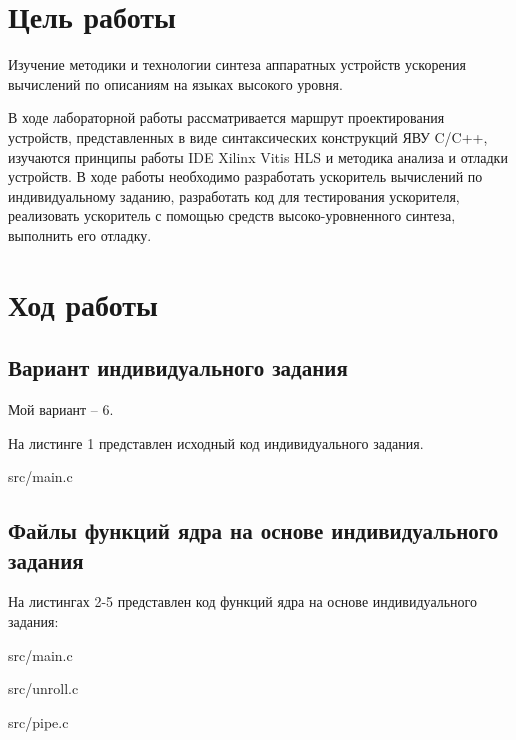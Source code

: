 \chapter*{Цель работы}
Изучение методики и технологии синтеза аппаратных устройств ускорения вычислений по описаниям на языках высокого уровня. 

В ходе лабораторной работы рассматривается маршрут проектирования устройств, представленных в виде синтаксических конструкций ЯВУ C/C++, изучаются принципы работы IDE Xilinx Vitis HLS и методика анализа и отладки устройств. В ходе работы необходимо разработать ускоритель вычислений по индивидуальному заданию, разработать код для тестирования ускорителя, реализовать ускоритель с помощью средств высоко-уровненного синтеза, выполнить его отладку.

\chapter*{Ход работы}

\section*{Вариант индивидуального задания}
Мой вариант -- 6.

На листинге 1 представлен исходный код индивидуального задания.
\begin{lstinputlisting}[caption=Исходный код индивидуального задания, 
	basicstyle=\footnotesize\ttfamily, frame=single,breaklines=true]{src/main.c}
\end{lstinputlisting}

\section*{Файлы функций ядра на основе индивидуального задания}
На листингах 2-5 представлен код функций ядра на основе индивидуального задания:

\begin{lstinputlisting}[caption=Код без изменений, 
	basicstyle=\footnotesize\ttfamily, frame=single,breaklines=true]{src/main.c}
\end{lstinputlisting}

\begin{lstinputlisting}[caption=Развернутый цикл, 
	basicstyle=\footnotesize\ttfamily, frame=single,breaklines=true]{src/unroll.c}
\end{lstinputlisting}

\begin{lstinputlisting}[caption=Конвейерное исполнение, 
	basicstyle=\footnotesize\ttfamily, frame=single,breaklines=true]{src/pipe.c}
\end{lstinputlisting}

